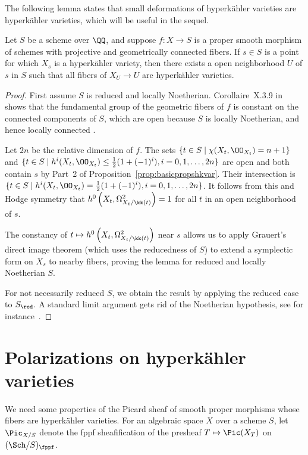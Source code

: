 The following lemma states that small deformations of hyperk\"ahler varieties are hyperk\"ahler varieties, which will be useful in the sequel.
\begin{lemma}\label{lem:hkopen}
Let $S$ be a scheme over $\QQ$, and suppose $f\colon X \rightarrow S$ is a proper smooth morphism of schemes with projective and geometrically connected fibers. If $s \in S$ is a point for which $X_{s}$ is a hyperk\"ahler variety, then there exists a open neighborhood $U$ of $s$ in $S$ such that all fibers of $X_{U} \rightarrow U$ are hyperk\"ahler varieties.
\end{lemma}
\begin{proof}
First assume $S$ is reduced and locally Noetherian. Corollaire~X.3.9 in~\cite{SGA1} shows that the fundamental group of the geometric fibers of $f$ is constant on the connected components of $S$, which are open because $S$ is locally Noetherian, and hence locally connected \!\cite[Tag 04MF]{SP}.

Let $2n$ be the relative dimension of $f$. The sets $\{t \in S \mid \chi(X_t, \OO_{X_t}) = n + 1\}$ and $\{t \in S \mid h^i(X_{t}, \OO_{X_t}) \leq \tfrac{1}{2}(1 + (-1)^i), i = 0,1,\ldots,2n\}$ are open and both contain $s$ by Part~2 of Proposition~\ref{prop:basicpropshkvar}. Their intersection is $\{t \in S \mid h^i(X_t,\OO_{X_t}) = \tfrac{1}{2}(1 + (-1)^i), i = 0,1,\ldots,2n \}$. It follows from this and Hodge symmetry that $h^0\left(X_{t},\Omega^2_{{X_t}/{\kk(t)}}\right) = 1$ for all $t$ in an open neighborhood of $s$.

The constancy of $t \mapsto h^0\left(X_t,\Omega^2_{{X_t}/{\kk(t)}}\right)$ near $s$ allows us to apply Grauert's direct image theorem (which uses the reducedness of $S$) to extend a symplectic form on $X_{s}$ to nearby fibers, proving the lemma for reduced and locally Noetherian $S$.  %

For not necessarily reduced $S$, we obtain the result by applying the reduced case to $S_{\red}$. A standard limit argument gets rid of the Noetherian hypothesis, see for instance~\cite[Theorem~10.66]{GW}. %
\end{proof}

\section{Polarizations on hyperk\"ahler varieties}
We need some properties of the Picard sheaf of smooth proper morphisms whose fibers are hyperk\"ahler varieties. For an algebraic space $X$ over a scheme $S$, let $\Pic_{{X}/{S}}$ denote the fppf sheafification of the presheaf $T \mapsto \Pic(X_T)$ on $(\Sch/S)_{\fppf}$.

